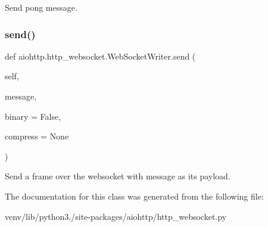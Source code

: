 \begin{DoxyVerb}Send pong message.\end{DoxyVerb}
 \mbox{\label{classaiohttp_1_1http__websocket_1_1_web_socket_writer_ab2bc04b540c8f5ebce8fba83670481b4}} 
\subsubsection{\texorpdfstring{send()}{send()}}
{\footnotesize\ttfamily def aiohttp.\+http\+\_\+websocket.\+Web\+Socket\+Writer.\+send (\begin{DoxyParamCaption}\item[{}]{self,  }\item[{}]{message,  }\item[{}]{binary = {\ttfamily False},  }\item[{}]{compress = {\ttfamily None} }\end{DoxyParamCaption})}

\begin{DoxyVerb}Send a frame over the websocket with message as its payload.\end{DoxyVerb}
 

The documentation for this class was generated from the following file\+:\begin{DoxyCompactItemize}
\item 
venv/lib/python3./site-\/packages/aiohttp/http\+\_\+websocket.\+py\end{DoxyCompactItemize}
